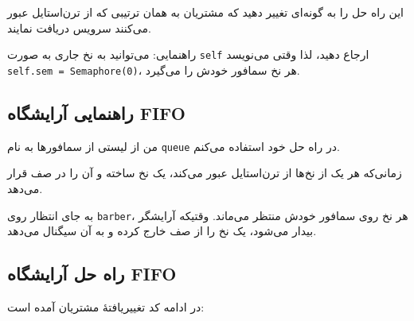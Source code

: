 \documentclass{book}
\newcommand{\clearemptydoublepage}{\newpage\cleardoublepage}
\begin{document}
	این راه حل را به گونه‌ای تغییر دهید که مشتریان به همان ترتیبی که از ترن‌استایل عبور می‌کنند سرویس دریافت نمایند.
  
	راهنمایی: می‌توانید به نخ جاری به صورت {\tt self} ارجاع دهید، 
	لذا وقتی می‌نویسد {\tt self.sem = Semaphore(0)}، هر نخ سمافور خودش را می‌گیرد.


\clearemptydoublepage
\subsection{راهنمایی آرایشگاه FIFO}

	من از لیستی از سمافورها به نام {\tt queue} در راه حل خود استفاده می‌کنم.

\begin{latin}
%

\end{latin}

	زمانی‌که هر یک از نخ‌ها از ترن‌استایل عبور می‌کند، یک نخ ساخته و آن را در صف قرار می‌دهد.

	به جای انتظار روی {\tt barber}، هر نخ روی سمافور خودش منتظر می‌ماند. 
	وقتیکه آرایشگر بیدار می‌شود، یک نخ را از صف خارج کرده و به آن سیگنال می‌دهد.


\clearemptydoublepage
\subsection{راه حل آرایشگاه FIFO}

	در ادامه کد تغییریافتهٔ مشتریان آمده است:
\end{document}
